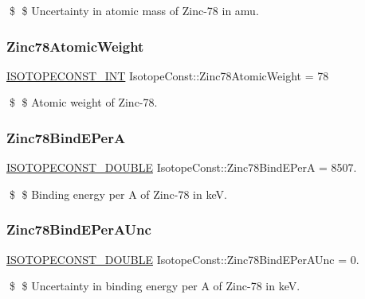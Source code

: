 \$ \$ Uncertainty in atomic mass of Zinc-\/78 in amu. \mbox{\label{group___isotope_const-_zinc-_zn78_gaee415fd90fd7a371f87d74ef248eedd3}} 
\subsubsection{\texorpdfstring{Zinc78\+Atomic\+Weight}{Zinc78AtomicWeight}}
{\footnotesize\ttfamily \mbox{\hyperlink{group___isotope_const-_macros_ga5f18360b3e99483a35c32d789e62621c}{I\+S\+O\+T\+O\+P\+E\+C\+O\+N\+S\+T\+\_\+\+I\+NT}} Isotope\+Const\+::\+Zinc78\+Atomic\+Weight = 78}

\$ \$ Atomic weight of Zinc-\/78. \mbox{\label{group___isotope_const-_zinc-_zn78_gac2c756be3faf61ebf65d3deb8d980913}} 
\subsubsection{\texorpdfstring{Zinc78\+Bind\+E\+PerA}{Zinc78BindEPerA}}
{\footnotesize\ttfamily \mbox{\hyperlink{group___isotope_const-_macros_ga8f45a7272ce02c0b4c65c44636ed719a}{I\+S\+O\+T\+O\+P\+E\+C\+O\+N\+S\+T\+\_\+\+D\+O\+U\+B\+LE}} Isotope\+Const\+::\+Zinc78\+Bind\+E\+PerA = 8507.}

\$ \$ Binding energy per A of Zinc-\/78 in keV. \mbox{\label{group___isotope_const-_zinc-_zn78_gaec4dadcf0801118291a08516d3662fbb}} 
\subsubsection{\texorpdfstring{Zinc78\+Bind\+E\+Per\+A\+Unc}{Zinc78BindEPerAUnc}}
{\footnotesize\ttfamily \mbox{\hyperlink{group___isotope_const-_macros_ga8f45a7272ce02c0b4c65c44636ed719a}{I\+S\+O\+T\+O\+P\+E\+C\+O\+N\+S\+T\+\_\+\+D\+O\+U\+B\+LE}} Isotope\+Const\+::\+Zinc78\+Bind\+E\+Per\+A\+Unc = 0.}

\$ \$ Uncertainty in binding energy per A of Zinc-\/78 in keV. \mbox{\label{group___isotope_const-_zinc-_zn78_gafc93be307c6bd43c39233785c4a90a88}} 
